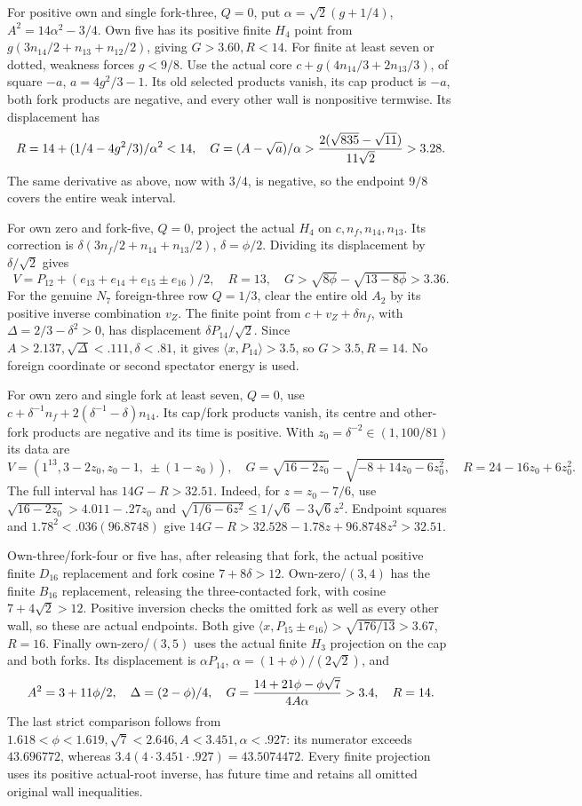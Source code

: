 \documentclass[11pt]{article}
\theoremstyle{definition}
\theoremstyle{remark}
\newcommand{\ip}[2]{\langle #1,#2\rangle}
\begin{document}
For positive own and single fork-three, \(Q=0\), put
\(\alpha=\sqrt2(g+1/4)\), \(A^2=14\alpha^2-3/4\).
Own five has its positive finite \(H_4\) point from
\(g(3n_{14}/2+n_{13}+n_{12}/2)\), giving \(G>3.60,R<14\).
For finite at least seven or dotted, weakness forces \(g<9/8\).
Use the actual core \(c+g(4n_{14}/3+2n_{13}/3)\), of square
\(-a\), \(a=4g^2/3-1\). Its old selected products vanish,
its cap product is \(-a\), both fork products are negative,
and every other wall is nonpositive termwise. Its displacement
has
\[
 R=14+(1/4-4g^2/3)/\alpha^2<14,\quad
 G=(A-\sqrt a)/\alpha>
 {2(\sqrt{835}-\sqrt{11})\over11\sqrt2}>3.28.
\]
The same derivative as above, now with \(3/4\), is negative,
so the endpoint \(9/8\) covers the entire weak interval.

For own zero and fork-five, \(Q=0\), project the actual \(H_4\)
on \(c,n_f,n_{14},n_{13}\). Its correction is
\(\delta(3n_f/2+n_{14}+n_{13}/2)\), \(\delta=\phi/2\).
Dividing its displacement by \(\delta/\sqrt2\) gives
\[
 V=P_{12}+(e_{13}+e_{14}+e_{15}\pm e_{16})/2,\quad
 R=13,\quad G>\sqrt{8\phi}-\sqrt{13-8\phi}>3.36.
\]
For the genuine \(N_7\) foreign-three row \(Q=1/3\), clear
the entire old \(A_2\) by its positive inverse combination \(v_Z\).
The finite point from \(c+v_Z+\delta n_f\), with
\(\Delta=2/3-\delta^2>0\), has displacement
\(\delta P_{14}/\sqrt2\). Since
\(A>2.137,\sqrt\Delta<.111,\delta<.81\), it gives
\(\ip x{P_{14}}>3.5\), so \(G>3.5,R=14\).
No foreign coordinate or second spectator energy is used.

For own zero and single fork at least seven, \(Q=0\), use
\(c+\delta^{-1}n_f+2(\delta^{-1}-\delta)n_{14}\).
Its cap/fork products vanish, its centre and other-fork products
are negative and its time is positive. With
\(z_0=\delta^{-2}\in(1,100/81)\) its data are
\[
 V=(1^{13},3-2z_0,z_0-1,\ \pm(1-z_0)),\quad
 G=\sqrt{16-2z_0}-\sqrt{-8+14z_0-6z_0^2},\quad
 R=24-16z_0+6z_0^2.
\]
The full interval has \(14G-R>32.51\). Indeed, for
\(z=z_0-7/6\), use
\(\sqrt{16-2z_0}>4.011-.27z_0\) and
\(\sqrt{1/6-6z^2}\le1/\sqrt6-3\sqrt6z^2\).
Endpoint squares and \(1.78^2<.036(96.8748)\) give
\(14G-R>32.528-1.78z+96.8748z^2>32.51\).

Own-three/fork-four or five has, after releasing that fork,
the actual positive finite \(D_{16}\) replacement and fork
cosine \(7+8\delta>12\). Own-zero/\((3,4)\) has the finite
\(B_{16}\) replacement, releasing the three-contacted fork,
with cosine \(7+4\sqrt2>12\). Positive inversion checks the
omitted fork as well as every other wall, so these are actual
endpoints. Both give
\(\ip x{P_{15}\pm e_{16}}>\sqrt{176/13}>3.67\), \(R=16\).
Finally own-zero/\((3,5)\) uses the actual finite \(H_3\)
projection on the cap and both forks. Its displacement is
\(\alpha P_{14}\), \(\alpha=(1+\phi)/(2\sqrt2)\), and
\[
 A^2=3+11\phi/2,\quad \Delta=(2-\phi)/4,\quad
 G={14+21\phi-\phi\sqrt7\over4A\alpha}>3.4,\quad R=14.
\]
The last strict comparison follows from
\(1.618<\phi<1.619,\sqrt7<2.646,A<3.451,\alpha<.927\):
its numerator exceeds \(43.696772\), whereas
\(3.4(4\cdot3.451\cdot.927)=43.5074472\).
Every finite projection uses its positive actual-root inverse,
has future time and retains all omitted original wall inequalities.
\end{document}
